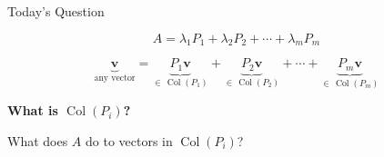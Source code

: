 \documentclass[10pt]{beamer}
\theoremstyle{definition}
\newcommand{\x}[1]{\alert{\textbf{#1}}}
\begin{document}
\begin{frame}{Today's Question}

\vfill

\begin{center}
$$A = \lambda_1 P_1 + \lambda_2 P_2 + \cdots + \lambda_m P_m$$

\vspace{0.6cm}

$$\underbrace{\mathbf{v}}_{\text{any vector}} = \underbrace{P_1 \mathbf{v}}_{\in\,\operatorname{Col}(P_1)} + \underbrace{P_2\mathbf{v}}_{\in\,\operatorname{Col}(P_2)} + \cdots + \underbrace{P_m\mathbf{v}}_{\in\,\operatorname{Col}(P_m)}$$
\end{center}

\vfill

\begin{center}
{\Large \x{What is $\operatorname{Col}(P_i)$?}}

\vspace{0.5cm}

{\Large What does $A$ do to vectors in $\operatorname{Col}(P_i)$?}
\end{center}

\vfill

\end{frame}
\end{document}
